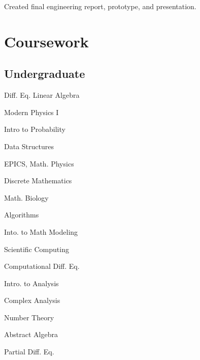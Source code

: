 \documentclass[]{deedy-resume-openfont}
\begin{document}
\begin{minipage}[t]{0.55\textwidth}
\vspace{\topsep}
\begin{tightemize}
\item Created final engineering report, prototype, and presentation.
\end{tightemize}
\sectionsep


\section{Coursework}
\subsection{Undergraduate}
\begin{minipage}[t]{0.45\textwidth} 
\vspace{\topsep} %
\begin{tightemize}
\item Diff. Eq. Linear Algebra
\item Modern Physics I
\item Intro to Probability
\item Data Structures
\item EPICS, Math. Physics
\item Discrete Mathematics
\item Math. Biology
\item Algorithms
\end{tightemize}
\end{minipage}
\begin{minipage}[t]{0.45\textwidth}
\vspace{\topsep} %
\begin{tightemize}
\item Into. to Math Modeling
\item Scientific Computing
\item Computational Diff. Eq.
\item Intro. to Analysis
\item Complex Analysis
\item Number Theory
\item Abstract Algebra
\item Partial Diff. Eq.
\end{tightemize}
\end{minipage}
\sectionsep



\end{minipage}
\end{document}
